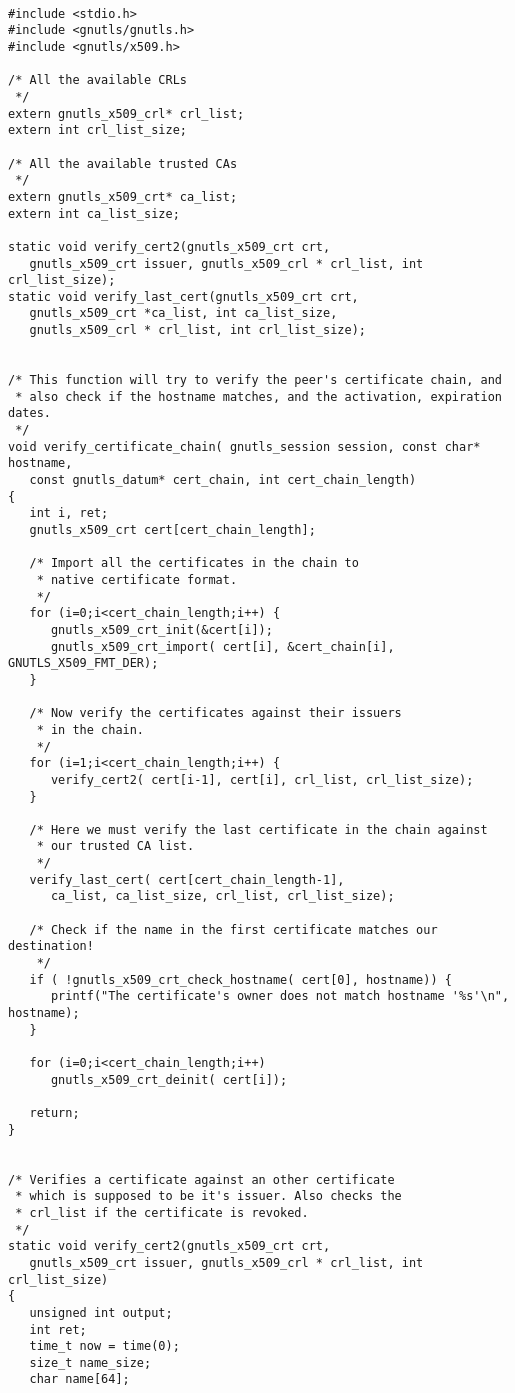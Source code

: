 \label{ex:verify-chain}

\begin{verbatim}

#include <stdio.h>
#include <gnutls/gnutls.h>
#include <gnutls/x509.h>

/* All the available CRLs
 */
extern gnutls_x509_crl* crl_list;
extern int crl_list_size;

/* All the available trusted CAs
 */
extern gnutls_x509_crt* ca_list;
extern int ca_list_size;

static void verify_cert2(gnutls_x509_crt crt,
   gnutls_x509_crt issuer, gnutls_x509_crl * crl_list, int crl_list_size);
static void verify_last_cert(gnutls_x509_crt crt,
   gnutls_x509_crt *ca_list, int ca_list_size,
   gnutls_x509_crl * crl_list, int crl_list_size);


/* This function will try to verify the peer's certificate chain, and
 * also check if the hostname matches, and the activation, expiration dates.
 */
void verify_certificate_chain( gnutls_session session, const char* hostname,
   const gnutls_datum* cert_chain, int cert_chain_length)
{
   int i, ret;
   gnutls_x509_crt cert[cert_chain_length];

   /* Import all the certificates in the chain to
    * native certificate format.
    */
   for (i=0;i<cert_chain_length;i++) {
      gnutls_x509_crt_init(&cert[i]);
      gnutls_x509_crt_import( cert[i], &cert_chain[i], GNUTLS_X509_FMT_DER);
   }

   /* Now verify the certificates against their issuers
    * in the chain.
    */   
   for (i=1;i<cert_chain_length;i++) {
      verify_cert2( cert[i-1], cert[i], crl_list, crl_list_size);
   }

   /* Here we must verify the last certificate in the chain against
    * our trusted CA list.
    */
   verify_last_cert( cert[cert_chain_length-1], 
      ca_list, ca_list_size, crl_list, crl_list_size);

   /* Check if the name in the first certificate matches our destination!
    */
   if ( !gnutls_x509_crt_check_hostname( cert[0], hostname)) {
      printf("The certificate's owner does not match hostname '%s'\n", hostname);
   }

   for (i=0;i<cert_chain_length;i++)
      gnutls_x509_crt_deinit( cert[i]);

   return;
}


/* Verifies a certificate against an other certificate
 * which is supposed to be it's issuer. Also checks the
 * crl_list if the certificate is revoked.
 */
static void verify_cert2(gnutls_x509_crt crt,
   gnutls_x509_crt issuer, gnutls_x509_crl * crl_list, int crl_list_size)
{ 
   unsigned int output;
   int ret;
   time_t now = time(0);
   size_t name_size;
   char name[64];


\end{verbatim}
